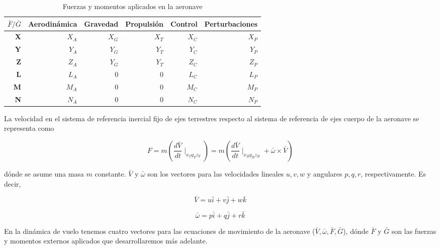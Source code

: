 \begin{table}[!h]
\caption{Fuerzas y momentos aplicados en la aeronave}
\centering
\begin{tabular}{|r|r|r|r|r|r|}
     \hline
     $\bar{F}/\bar{G}$ & Aerodinámica & Gravedad & Propulsión & Control & Perturbaciones \\
     \hline
     \textbf{X} & $X_{A}$ & $X_{G}$ & $X_{T}$ & $X_{C}$ & $X_{P}$ \\
     \hline
     \textbf{Y} & $Y_{A}$ & $Y_{G}$ & $Y_{T}$ & $Y_{C}$ & $Y_{P}$ \\
     \hline
     \textbf{Z} & $Z_{A}$ & $Y_{G}$ & $Y_{T}$ & $Z_{C}$ & $Z_{P}$ \\
     \hline
     \textbf{L} & $L_{A}$ & 0 & 0 & $L_{C}$ & $L_{P}$ \\
     \hline
     \textbf{M} & $M_{A}$ & 0 & 0 & $M_{C}$ & $M_{P}$ \\
     \hline
      \textbf{N} & $N_{A}$ & 0 & 0 & $N_{C}$ & $N_{P}$ \\
     \hline
\end{tabular}
\end{table}

La velocidad en el sistema de referencia inercial fijo de ejes terrestres respecto al sistema de referencia de ejes cuerpo de la aeronave se representa como

\begin{equation}
\label{momento lineal traslacional}
    F = m ( \frac{d \bar{V}}{dt}\mid_{x_{T} y_{T} z_{T}}) = m (\frac{d \bar{V}}{dt}\mid_{x_{B} y_{B} z_{B}} + \bar{\omega} \times \bar{V} )
\end{equation}

dónde se asume una masa $m$ constante. $\bar{V}$ y $\bar{\omega}$ son los vectores para las velocidades lineales $u,v,w$ y angulares $p,q,r$, respectivamente. Es decir,

\begin{equation}
    \bar{V} = u\bar{i}+v\bar{j}+w\bar{k} 
\end{equation}

\begin{equation}
    \bar{\omega} = p\bar{i}+q\bar{j}+r\bar{k} 
\end{equation}


En la dinámica de vuelo tenemos cuatro vectores para las ecuaciones de movimiento de la aeronave ($\bar{V}, \bar{\omega}, \bar{F}, \bar{G}$), dónde $\bar{F}$ y $\bar{G}$ son las fuerzas y momentos externos aplicados que desarrollaremos más adelante. 

